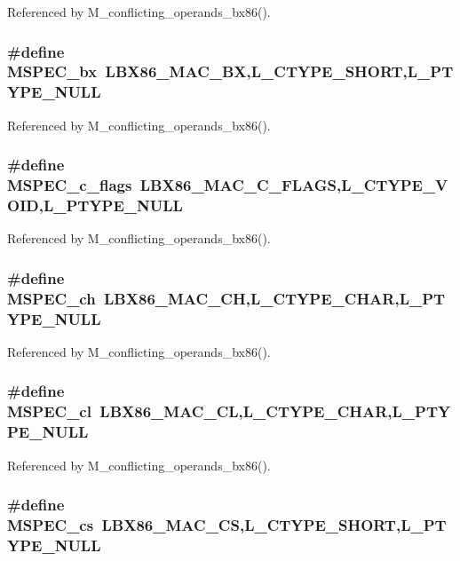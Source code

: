 Referenced by M\_\-conflicting\_\-operands\_\-bx86().
\subsubsection{\setlength{\rightskip}{0pt plus 5cm}\#define MSPEC\_\-bx~LBX86\_\-MAC\_\-BX,L\_\-CTYPE\_\-SHORT,L\_\-PTYPE\_\-NULL}\label{ml__bx86_8c_6f8044ea02bd6fc995f9ffa4f82e19b7}




Referenced by M\_\-conflicting\_\-operands\_\-bx86().
\subsubsection{\setlength{\rightskip}{0pt plus 5cm}\#define MSPEC\_\-c\_\-flags~LBX86\_\-MAC\_\-C\_\-FLAGS,L\_\-CTYPE\_\-VOID,L\_\-PTYPE\_\-NULL}\label{ml__bx86_8c_5a985d309e7a2771f42f3f4779da72e3}




Referenced by M\_\-conflicting\_\-operands\_\-bx86().
\subsubsection{\setlength{\rightskip}{0pt plus 5cm}\#define MSPEC\_\-ch~LBX86\_\-MAC\_\-CH,L\_\-CTYPE\_\-CHAR,L\_\-PTYPE\_\-NULL}\label{ml__bx86_8c_6271b631e1c94cfae720822f2c3cb96c}




Referenced by M\_\-conflicting\_\-operands\_\-bx86().
\subsubsection{\setlength{\rightskip}{0pt plus 5cm}\#define MSPEC\_\-cl~LBX86\_\-MAC\_\-CL,L\_\-CTYPE\_\-CHAR,L\_\-PTYPE\_\-NULL}\label{ml__bx86_8c_16cb43d36345387ab6a81ec6f6affd60}




Referenced by M\_\-conflicting\_\-operands\_\-bx86().
\subsubsection{\setlength{\rightskip}{0pt plus 5cm}\#define MSPEC\_\-cs~LBX86\_\-MAC\_\-CS,L\_\-CTYPE\_\-SHORT,L\_\-PTYPE\_\-NULL}\label{ml__bx86_8c_11ee2827494b6667a699b7a06c8988f7}


